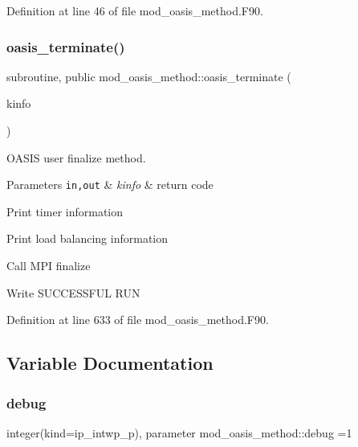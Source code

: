 Definition at line 46 of file mod\+\_\+oasis\+\_\+method.\+F90.

\mbox{\label{namespacemod__oasis__method_a4fb881336906c9452b6a9f250af9c3d7}} 
\subsubsection{\texorpdfstring{oasis\+\_\+terminate()}{oasis\_terminate()}}
{\footnotesize\ttfamily subroutine, public mod\+\_\+oasis\+\_\+method\+::oasis\+\_\+terminate (\begin{DoxyParamCaption}\item[{integer (kind=ip\+\_\+intwp\+\_\+p), intent(inout), optional}]{kinfo }\end{DoxyParamCaption})}



O\+A\+S\+IS user finalize method. 


\begin{DoxyParams}[1]{Parameters}
\mbox{\tt in,out}  & {\em kinfo} & return code \\
\hline
\end{DoxyParams}

\begin{DoxyItemize}
\item Print timer information
\item Print load balancing information
\item Call M\+PI finalize
\item Write S\+U\+C\+C\+E\+S\+S\+F\+UL R\+UN 
\end{DoxyItemize}

Definition at line 633 of file mod\+\_\+oasis\+\_\+method.\+F90.



\subsection{Variable Documentation}
\mbox{\label{namespacemod__oasis__method_a390290b92b6af57b2732cb7521532f1c}} 
\subsubsection{\texorpdfstring{debug}{debug}}
{\footnotesize\ttfamily integer(kind=ip\+\_\+intwp\+\_\+p), parameter mod\+\_\+oasis\+\_\+method\+::debug =1\hspace{0.3cm}{\ttfamily [private]}}



